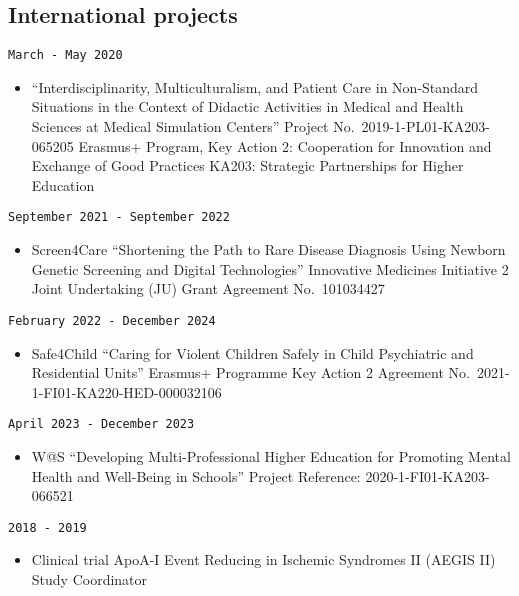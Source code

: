 \documentclass[
  12pt,
  letterpaper,
  DIV=11,
  numbers=noendperiod]{scrartcl}
\providecommand{\tightlist}{%
  \setlength{\itemsep}{0pt}\setlength{\parskip}{0pt}}\usepackage{longtable,booktabs,array}
\begin{document}
\subsection{International projects}\label{international-projects}

\texttt{March\ -\ May\ 2020}

\begin{itemize}
\tightlist
\item
  ``Interdisciplinarity, Multiculturalism, and Patient Care in
  Non-Standard Situations in the Context of Didactic Activities in
  Medical and Health Sciences at Medical Simulation Centers'' \textbar{}
  Project No.~2019-1-PL01-KA203-065205 \textbar{} Erasmus+ Program, Key
  Action 2: Cooperation for Innovation and Exchange of Good Practices
  \textbar{} KA203: Strategic Partnerships for Higher Education
\end{itemize}

\texttt{September\ 2021\ -\ September\ 2022}

\begin{itemize}
\tightlist
\item
  Screen4Care \textbar{} ``Shortening the Path to Rare Disease Diagnosis
  Using Newborn Genetic Screening and Digital Technologies'' \textbar{}
  Innovative Medicines Initiative 2 Joint Undertaking (JU) \textbar{}
  Grant Agreement No.~101034427
\end{itemize}

\texttt{February\ 2022\ -\ December\ 2024}

\begin{itemize}
\tightlist
\item
  Safe4Child \textbar{} ``Caring for Violent Children Safely in Child
  Psychiatric and Residential Units'' \textbar{} Erasmus+ Programme
  \textbar{} Key Action 2 \textbar{} Agreement
  No.~2021-1-FI01-KA220-HED-000032106
\end{itemize}

\texttt{April\ 2023\ -\ December\ 2023}

\begin{itemize}
\tightlist
\item
  W@S \textbar{} ``Developing Multi-Professional Higher Education for
  Promoting Mental Health and Well-Being in Schools'' \textbar{} Project
  Reference: 2020-1-FI01-KA203-066521
\end{itemize}

\texttt{2018\ -\ 2019}

\begin{itemize}
\tightlist
\item
  Clinical trial \textbar{} ApoA-I Event Reducing in Ischemic Syndromes
  II (AEGIS II) \textbar{} Study Coordinator
\end{itemize}
\end{document}
